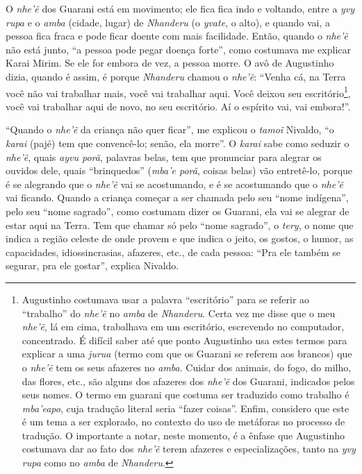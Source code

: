 O \emph{nhe’ẽ} dos Guarani está em movimento; ele fica fica indo e
voltando, entre a \emph{yvy rupa} e o \emph{amba} (cidade, lugar) de \emph{Nhanderu} (o
\emph{yvate}, o alto), e quando vai, a pessoa fica fraca e pode ficar doente
com mais facilidade. Então, quando o \emph{nhe’ẽ} não está junto, ``a
pessoa pode pegar doença forte'', como costumava me explicar Karai
Mirim. Se ele for embora de vez, a pessoa morre. O avô de Augustinho
dizia, quando é assim, é porque \emph{Nhanderu} chamou o \emph{nhe’ẽ}: ``Venha
cá, na Terra você não vai trabalhar mais, você vai trabalhar aqui. Você
deixou seu escritório\footnote{Augustinho costumava usar a palavra
``escritório'' para se referir ao ``trabalho'' do \emph{nhe’ẽ} no \emph{amba} de
\emph{Nhanderu}. Certa vez me disse que o meu \emph{nhe’ẽ}, lá em cima,
trabalhava em um escritório, escrevendo no computador, concentrado. É
difícil saber até que ponto Augustinho usa estes termos para explicar a
uma \emph{jurua} (termo com que os Guarani se referem aos brancos) que o
\emph{nhe’ẽ} tem os seus afazeres no \emph{amba}. Cuidar dos animais, do fogo,
do milho, das flores, etc., são alguns dos afazeres dos \emph{nhe’ẽ} dos
Guarani, indicados pelos seus nomes. O termo em guarani que costuma ser
traduzido como trabalho é \emph{mba’eapo}, cuja tradução literal seria
``fazer coisas''. Enfim, considero que este é um tema a ser explorado, no
contexto do uso de metáforas no processo de tradução. O importante a
notar, neste momento, é a ênfase que Augustinho costumava dar ao fato
dos \emph{nhe’ẽ} terem afazeres e especializações, tanto na \emph{yvy rupa} como
no \emph{amba} de \emph{Nhanderu}.}, você vai trabalhar aqui de novo, no seu
escritório. Aí o espírito vai, vai embora!''.

``Quando o \emph{nhe’ẽ} da criança não quer ficar'', me explicou o
\emph{tamoĩ} Nivaldo, ``o \emph{karai} (pajé) tem que convencê-lo; senão, ela
morre''. O \emph{karai} sabe como seduzir o \emph{nhe’ẽ}, quais \emph{ayvu porã},
palavras belas, tem que pronunciar para alegrar os ouvidos dele, quais
``brinquedos'' (\emph{mba’e porã}, coisas belas) vão entretê-lo, porque é se
alegrando que o \emph{nhe’ẽ} vai se acostumando, e é se acostumando que
o \emph{nhe’ẽ} vai ficando. Quando a criança começar a ser chamada pelo
seu ``nome indígena'', pelo seu ``nome sagrado'', como costumam dizer os
Guarani, ela vai se alegrar de estar aqui na Terra. Tem que chamar só
pelo ``nome sagrado'', o \emph{tery}, o nome que indica a região celeste de onde
provem e que indica o jeito, os gostos, o humor, as capacidades,
idiossincrasias, afazeres, etc., de cada pessoa: ``Pra ele também se
segurar, pra ele gostar'', explica Nivaldo.

